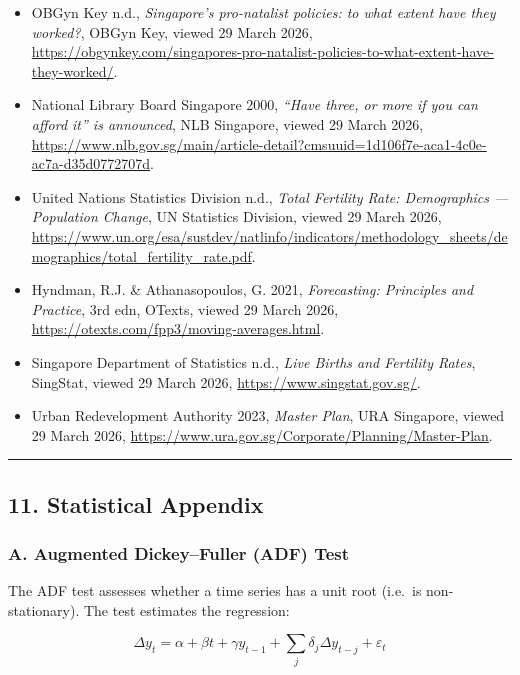 \documentclass[
]{article}
\providecommand{\tightlist}{%
  \setlength{\itemsep}{0pt}\setlength{\parskip}{0pt}}
\begin{document}
\begin{itemize}
\tightlist
\item
  OBGyn Key n.d., \emph{Singapore's pro-natalist policies: to what
  extent have they worked?}, OBGyn Key, viewed 29 March 2026,
  \url{https://obgynkey.com/singapores-pro-natalist-policies-to-what-extent-have-they-worked/}.
\item
  National Library Board Singapore 2000, \emph{``Have three, or more if
  you can afford it'' is announced}, NLB Singapore, viewed 29 March
  2026,
  \url{https://www.nlb.gov.sg/main/article-detail?cmsuuid=1d106f7e-aca1-4c0e-ac7a-d35d0772707d}.
\item
  United Nations Statistics Division n.d., \emph{Total Fertility Rate:
  Demographics --- Population Change}, UN Statistics Division, viewed 29
  March 2026,
  \url{https://www.un.org/esa/sustdev/natlinfo/indicators/methodology_sheets/demographics/total_fertility_rate.pdf}.
\item
  Hyndman, R.J. \& Athanasopoulos, G. 2021, \emph{Forecasting:
  Principles and Practice}, 3rd edn, OTexts, viewed 29 March 2026,
  \url{https://otexts.com/fpp3/moving-averages.html}.
\item
  Singapore Department of Statistics n.d., \emph{Live Births and
  Fertility Rates}, SingStat, viewed 29 March 2026,
  \url{https://www.singstat.gov.sg/}.
\item
  Urban Redevelopment Authority 2023, \emph{Master Plan}, URA Singapore,
  viewed 29 March 2026,
  \url{https://www.ura.gov.sg/Corporate/Planning/Master-Plan}.
\end{itemize}

\begin{center}\rule{0.5\linewidth}{0.5pt}\end{center}

\subsection{11. Statistical Appendix}\label{statistical-appendix}

\subsubsection{A. Augmented Dickey--Fuller (ADF)
Test}\label{a.-augmented-dickeyfuller-adf-test}

The ADF test assesses whether a time series has a unit root (i.e.~is
non-stationary). The test estimates the regression:

\[
\Delta y_t = \alpha + \beta t + \gamma y_{t-1} + \sum_{j} \delta_j \Delta y_{t-j} + \varepsilon_t
\]
\end{document}
